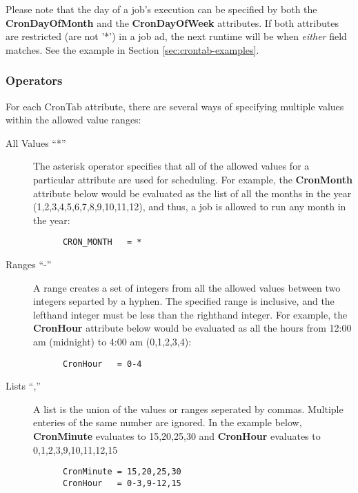 \documentclass[a4paper, 11pt]{article}
\newcommand{\SubmitCmd}[1]{\textbf{#1}}		%
\begin{document}
Please note that the day of a job's execution can be specified by both the \SubmitCmd{CronDayOfMonth} and the \SubmitCmd{CronDayOfWeek} attributes. If both attributes are restricted (are not '*') in a job ad, the next runtime will be when \emph{either} field matches. See the example in Section \ref{sec:crontab-examples}.

\subsubsection{Operators}
\label{sec:crontab-operators}
For each CronTab attribute, there are several ways of specifying multiple values within the allowed value ranges:

\begin{description}
   \item[All Values ``*'']
   The asterisk operator specifies that all of the allowed values for a
   particular attribute are used for scheduling. For example, the 
   \SubmitCmd{CronMonth} attribute below would be evaluated as the list of
   all the months in the year (1,2,3,4,5,6,7,8,9,10,11,12), and thus, a job
   is allowed to run any month in the year:
   
   \begin{verbatim}
      CRON_MONTH   = *
   \end{verbatim}

   \item[Ranges ``-'']
   A range creates a set of integers from all the allowed values between two
   integers separted by a hyphen. The specified range is inclusive, and the
   lefthand integer must be less than the righthand integer. For example,
   the \SubmitCmd{CronHour} attribute below would be evaluated as all the
   hours from 12:00 am (midnight) to 4:00 am (0,1,2,3,4):
   
   \begin{verbatim}
      CronHour   = 0-4
   \end{verbatim}
   
   \item[Lists ``,'']
   A list is the union of the values or ranges seperated by commas. Multiple
   enteries of the same number are ignored. In the example below,
   \SubmitCmd{CronMinute} evaluates to 15,20,25,30 and \SubmitCmd{CronHour}
   evaluates to 0,1,2,3,9,10,11,12,15
   
   \begin{verbatim}
      CronMinute = 15,20,25,30
      CronHour   = 0-3,9-12,15
   \end{verbatim}
      

\end{description}
\end{document}
